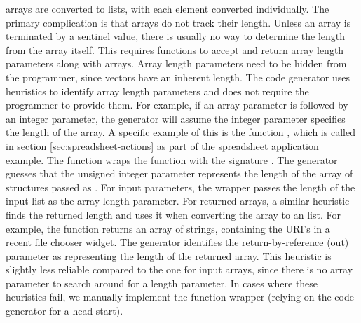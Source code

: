 \documentclass[article,shortnames]{jss}
\begin{document}
 arrays are converted to  lists, 
with each
element
converted individually. The primary complication is that 
arrays 
do not track their length. Unless an array is terminated by a sentinel
value,
there is usually no way to determine the length from the array itself.
This 
requires  functions to accept and return array length
parameters
along with arrays. Array length parameters need to be hidden from the
 programmer, since  vectors have an inherent
length.
The code generator uses heuristics to identify array length parameters
and
does not require the  programmer to provide them. 
For
example,
if an array parameter is followed by an integer parameter, the
generator
will assume the integer parameter specifies the length of the array.
A specific example of this is the function
, which is called in section
\ref{sec:spreadsheet-actions} as part of the spreadsheet application
example. The function wraps the  function with the
signature . The generator guesses that the unsigned integer
 parameter represents the length of the array of
 structures passed as . 
For input parameters, the wrapper passes the length of the input
 list as the array length parameter. For returned arrays,
a similar heuristic finds the returned length and uses it when
converting the array to an  list. For example, the
 function
 returns an array of strings, containing the URI's in a
recent file chooser widget. The generator identifies the 
return-by-reference (out) parameter as representing the length of the
returned array. This heuristic is slightly less reliable compared to
the one for input arrays, since there is no array parameter to search
around for a length parameter.
In cases where these heuristics fail, we manually implement the
function wrapper (relying on the code generator for a head start).
\end{document}
